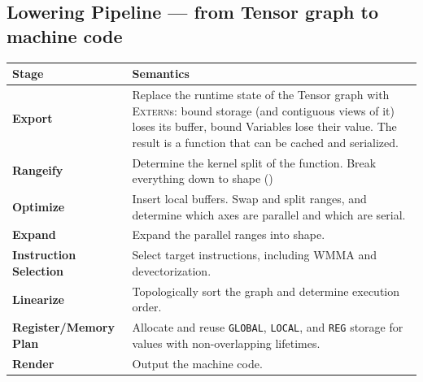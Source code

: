 \documentclass[10pt,letterpaper]{article}
\newcommand{\op}[1]{\textsc{#1}}
\begin{document}
\subsection*{Lowering Pipeline \normalfont\small--- from Tensor graph to machine code}

\begin{tabular}{@{}l p{9.7cm}@{}}
\toprule
\textbf{Stage} & \textbf{Semantics} \\
\midrule
\textbf{Export} & Replace the runtime state of the Tensor graph with \op{Extern}s: bound storage (and contiguous views of it) loses its buffer, bound Variables lose their value. The result is a function that can be cached and serialized. \\
\textbf{Rangeify} & Determine the kernel split of the function. Break everything down to shape () \\
\textbf{Optimize} & Insert local buffers. Swap and split ranges, and determine which axes are parallel and which are serial. \\
\textbf{Expand} & Expand the parallel ranges into shape. \\
\textbf{Instruction Selection} & Select target instructions, including WMMA and devectorization. \\
\textbf{Linearize} & Topologically sort the graph and determine execution order. \\
\textbf{Register/Memory Plan} & Allocate and reuse \texttt{GLOBAL}, \texttt{LOCAL}, and \texttt{REG} storage for values with non-overlapping lifetimes. \\
\textbf{Render} & Output the machine code. \\
\bottomrule
\end{tabular}
\end{document}
